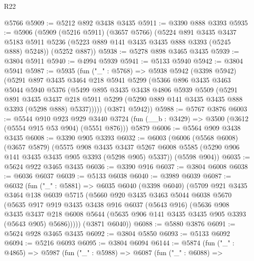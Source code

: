 \begin{lexlean}{R22}
\begin{coremodule}
    @5766
@5909 := @5212 @892 @3438 @3435
@5911 := @3390 @888 @3393
@5935 := @5906
    (@5909
      (@5216 @5911)
      (@3657 @5766)
      (@5224
        @891
        @3435
        @3437
        @5183
        @5911
        @5236
        (@5223 @889 @141 @3435 @3435 @888 @3393 (@5245 @888) @5248))
      (@5252 @887))
@5938 := @5278 @898 @3465 @3435
@5939 := @3804 @5911
@5940 := @4994 @5939
@5941 := @5133 @5940
@5942 := @3804 @5941
@5987 := @5935
    (fun ("_" : @5768) =>
    @5938
      @5942
      (@3398 @5942)
      (@5291
        @897
        @3435
        @3464
        @218
        @5941
        @5299
        (@5366
          @896
          @3435
          @3463
          @5044
          @5940
          @5376
          (@5499
            @895
            @3435
            @3438
            @4806
            @5939
            @5509
            (@5291
              @891
              @3435
              @3437
              @218
              @5911
              @5299
              (@5290 @889 @141 @3435 @3435 @888 @3393 (@5298 @888) @5337)))))
      (@3871 @5942))
@5988 := @5767 @3876
@6003 := @5544
    @910
    @923
    @929
    @3440
    @3724
    (fun (__b : @3429) => @3500 (@3612 (@5554 @915 @53 @904) (@5551 @876)))
    @5879
@6006 := @5564 @909 @3438 @3435
@6008 := @3390 @905 @3393
@6032 := @6003
    (@6006
      (@5568 @6008)
      (@3657 @5879)
      (@5575
        @908
        @3435
        @3437
        @5267
        @6008
        @5585
        (@5290 @906 @141 @3435 @3435 @905 @3393 (@5298 @905) @5337))
      (@5598 @904))
@6035 := @5624 @922 @3465 @3435
@6036 := @3390 @916
@6037 := @3804 @6008
@6038 := @6036 @6037
@6039 := @5133 @6038
@6040 := @3989 @6039
@6087 := @6032
    (fun ("_" : @5881) =>
    @6035
      @6040
      (@3398 @6040)
      (@5709
        @921
        @3435
        @3464
        @138
        @6039
        @5715
        (@5660
          @920
          @3435
          @3463
          @5044
          @6038
          @5670
          (@5635
            @917
            @919
            @3435
            @3438
            @916
            @6037
            (@5643 @916)
            (@5636
              @908
              @3435
              @3437
              @218
              @6008
              @5644
              (@5635 @906 @141 @3435 @3435 @905 @3393 (@5643 @905) @5686)))))
      (@3871 @6040))
@6088 := @5880 @3876
@6091 := @5624 @928 @3465 @3435
@6092 := @3804 @5850
@6093 := @5133 @6092
@6094 := @5216 @6093
@6095 := @3804 @6094
@6144 := @5874
    (fun ("_" : @4865) =>
    @5987
      (fun ("_" : @5988) =>
      @6087
        (fun ("_" : @6088) =>

\end{coremodule}
\end{lexlean}
